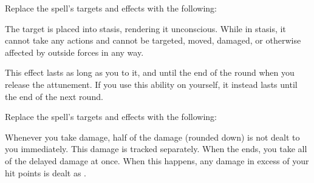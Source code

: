 


Replace the spell's targets and effects with the following:
\begin{spellcontent}

\begin{augmenttargetinginfo}



\end{augmenttargetinginfo}


\begin{augmenteffects}



\spelleffect
The target is placed into stasis, rendering it unconscious.
While in stasis, it cannot take any actions and cannot be targeted, moved, damaged, or otherwise affected by outside forces in any way.

This effect lasts as long as you  to it, and until the end of the round when you release the attunement.
If you use this ability on yourself, it instead lasts until the end of the next round.








\end{augmenteffects}

\end{spellcontent}








Replace the spell's targets and effects with the following:
\begin{spellcontent}

\begin{augmenttargetinginfo}



\end{augmenttargetinginfo}


\begin{augmenteffects}



\spelleffect
Whenever you take damage, half of the damage (rounded down) is not dealt to you immediately.
This damage is tracked separately.
When the ends, you take all of the delayed damage at once.
When this happens, any damage in excess of your hit points is dealt as .








\end{augmenteffects}

\end{spellcontent}





